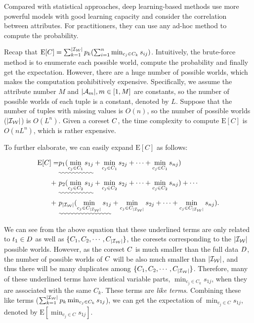 Compared with statistical approaches, deep learning-based methods use more powerful models with good learning capacity and consider the correlation between attributes. For practitioners, they can use any ad-hoc method to compute the probability.



 Recap that $\mathrm{E}[C] = \sum_{k= 1}^{|\mathcal{I_W}|} p_k (\sum_{i=1}^n \min_{c_j\in C_k}s_{ij})$. Intuitively, the brute-force method is to enumerate each possible world, compute the probability and finally get the expectation. However, there are a huge number of possible worlds, which makes the  computation prohibitively expensive. Specifically, we assume the attribute number $M$ and $|\mathcal{A}_m|, m\in [1, M]$ are  constants, so the number of possible worlds of each tuple is a constant, denoted by $L$.
Suppose that the number of tuples with missing values is $O(n)$, so the number of possible worlds ($|\mathcal{I_W}|$) is $O(L^n)$. Given a coreset $C$, the time complexity to compute $\mathrm{E}[C]$ is $O(nL^n)$, which is rather expensive.

 To further elaborate, we can easily expand $\mathrm{E}[C]$ as follows:

\vspace{-0.5em}
\begin{equation*}
\begin{aligned}
	\mathrm{E}[C] =& \uwave{p_1(\min_{c_j\in C_1}s_{1j}} + \min_{c_j\in C_1}s_{2j} + \cdots + \min_{c_j\in C_1}s_{nj})\\
	+ ~& \uwave{p_2(\min_{c_j\in C_2}s_{1j}} + \min_{c_j\in C_2}s_{2j} + \cdots + \min_{c_j\in C_2}s_{nj})+ \cdots \\
	+ ~& \uwave{p_{|\worlds|}(\min_{c_j\in C_{|\worlds|}}s_{1j}} + \min_{c_j\in C_{|\worlds|}}s_{2j} + \cdots + \min_{c_j\in C_{|\worlds|}}s_{nj}).
\end{aligned}
\end{equation*}

\noindent  We can see from the above equation that these underlined terms are only related to $t_1\in D$ as well as  $\{C_1, C_2, \cdots, C_{|\mathcal{I_W}|}\}$, \ie the coresets corresponding to the $|\mathcal{I_W}|$  possible worlds.
However, as the coreset $C$ is much smaller than the full data $D$, the number of possible worlds of $C$ will be also much smaller than $|\mathcal{I_W}|$, and thus there will be many duplicates among $\{C_1, C_2, \cdots, C_{|\mathcal{I_W}|}\}$.
Therefore, many of these underlined terms  have identical variable parts, \ie $\min_{c_j\in C_k} s_{1j}$, when they are associated with the same  $C_k$. These terms are \textit{like terms}. Combining these like terms  (\ie $\sum_{k=1}^{|\mathcal{I_W}|} p_k \min_{c_j\in C_k}s_{1j}$), we can get the expectation of $\min_{c_j\in C}s_{1j}$, denoted by $\mathrm{E}[\min_{c_j\in C}s_{1j}]$.




